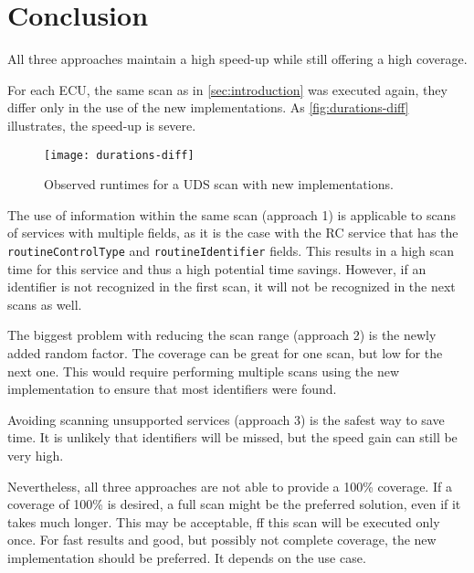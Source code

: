\section{Conclusion}

All three approaches maintain a high speed-up while still offering a high coverage.

For each ECU, the same scan as in \autoref{sec:introduction} was executed again, they differ only in the use of the new implementations. As \autoref{fig:durations-diff} illustrates, the speed-up is severe.

\begin{figure}[h]
    \centering
    \texttt{[image: durations-diff]}
    \caption{Observed runtimes for a UDS scan with new implementations.}
    \label{fig:durations-diff}
\end{figure}

The use of information within the same scan (approach 1) is applicable to scans of services with multiple fields, as it is the case with the RC service that has the \texttt{routineControlType} and \texttt{routineIdentifier} fields. This results in a high scan time for this service and thus a high potential time savings. However, if an identifier is not recognized in the first scan, it will not be recognized in the next scans as well.

The biggest problem with reducing the scan range (approach 2) is the newly added random factor. The coverage can be great for one scan, but low for the next one. This would require performing multiple scans using the new implementation to ensure that most identifiers were found.

Avoiding scanning unsupported services (approach 3) is the safest way to save time. It is unlikely that identifiers will be missed, but the speed gain can still be very high.

Nevertheless, all three approaches are not able to provide a 100\% coverage. 
If a coverage of 100\% is desired, a full scan might be the preferred solution, even if it takes much longer. This may be acceptable, ff this scan will be executed only once. For fast results and good, but possibly not complete coverage, the new implementation should be preferred. It depends on the use case.
